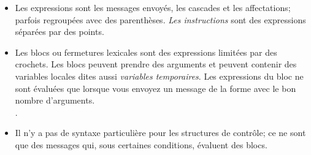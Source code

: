 \documentclass[a4paper,10pt,twoside]{book}
\begin{document}
\begin{itemize}
\item	Les expressions sont les messages envoy\'{e}s, les cascades et
  les affectations; parfois regroup\'{e}es avec des parenth\`{e}ses.
		\emph{Les instructions} sont des expressions s\'{e}par\'{e}es par des points.

\item	Les blocs ou fermetures lexicales sont des expressions limit\'{e}es par des crochets.
		Les blocs peuvent prendre des arguments et peuvent contenir
        des variables locales dites aussi \emph{variables temporaires}.
		Les expressions du bloc ne sont \'{e}valu\'{e}es que lorsque
        vous envoyez un message de la forme  avec le bon nombre d'arguments.\\
		.

\item	Il n'y a pas de syntaxe particuli\`{e}re pour les structures
  de contr\^{o}le; ce ne sont que des messages qui, sous certaines conditions, \'{e}valuent des blocs.\\

\end{itemize}

\ifx\wholebook\relax\else
\end{document}
